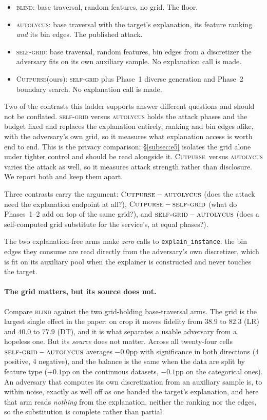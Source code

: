 \documentclass[sigconf,anonymous,review]{acmart}
\newcommand{\sys}{\textsc{Cutpurse}}
\begin{document}
\begin{itemize}
  \item \textsc{blind}: base traversal, random features, no grid. The floor.
  \item \textsc{autolycus}: base traversal with the target's explanation, its feature ranking \emph{and} its bin edges. The published attack.
  \item \textsc{self-grid}: base traversal, random features, bin edges from a discretizer the
  adversary fits on its own auxiliary sample. No explanation call is made.
  \item \sys (ours): \textsc{self-grid} plus Phase~1 diverse generation and
  Phase~2 boundary search. No explanation call is made.
\end{itemize}

Two of the contrasts this ladder supports answer different questions and should not be conflated.
\textsc{self-grid} versus \textsc{autolycus} holds the attack phases and the budget fixed and
replaces the explanation entirely, ranking and bin edges alike, with the adversary's own grid, so it
measures what explanation access is worth end to end. This is the privacy comparison;
\S\ref{subsec:e5} isolates the grid alone under tighter control and should be read alongside it. \sys\
versus \textsc{autolycus} varies the attack as well, so it measures attack strength rather than
disclosure. We report both and keep them apart.

Three contrasts carry the argument:
$\sys-\textsc{autolycus}$ (does the attack need the explanation endpoint at all?),
$\sys-\textsc{self-grid}$ (what do Phases~1--2 add on top of the same grid?), and
$\textsc{self-grid}-\textsc{autolycus}$ (does a self-computed grid substitute for the service's, at
equal phases?).

The two explanation-free arms make \emph{zero} calls to \texttt{explain\_instance}: the bin edges they
consume are read directly from the adversary's own discretizer, which is fit on its auxiliary pool
when the explainer is constructed and never touches the target.


\paragraph{The grid matters, but its source does not.} Compare \textsc{blind} against the two
grid-holding base-traversal arms. The grid is the largest single effect in the paper: on crop it moves
fidelity from $38.9$ to $82.3$ (LR) and $40.0$ to $77.9$ (DT), and it is what separates a usable
adversary from a hopeless one. But its \emph{source} does not matter. Across all twenty-four cells
$\textsc{self-grid}-\textsc{autolycus}$ averages $-0.0$pp with significance in both directions
(4 positive, 4 negative), and the balance is the same when the data are split by feature type
($+0.1$pp on the continuous datasets, $-0.1$pp on the categorical ones). An adversary that computes
its own discretization from an auxiliary sample is, to within noise, exactly as well off as one handed the target's explanation, and here that arm reads \emph{nothing} from the explanation, neither the
ranking nor the edges, so the substitution is complete rather than partial.
\end{document}
